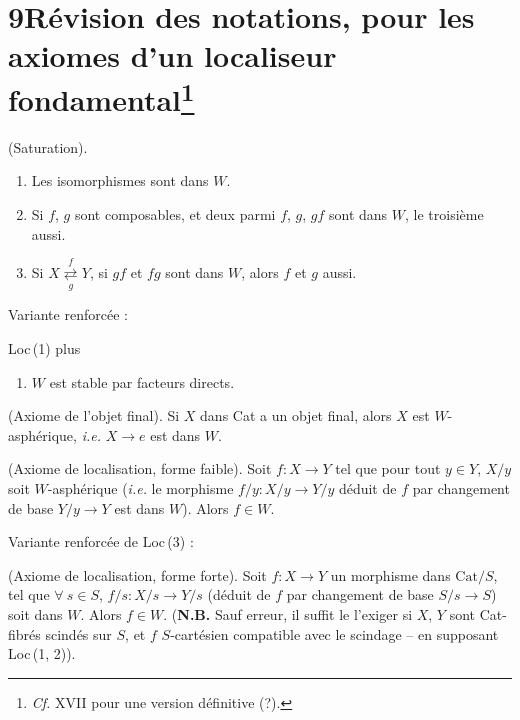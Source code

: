 \documentclass[11pt]{article}
\newcommand{\msp}[1]{\marginpar{\footnotesize [#1]}}
\begin{document}
\msp{page 116}

\section*{9\quad Révision des notations, pour les axiomes d'un localiseur fondamental\footnote[43]{\textit{Cf.} XVII pour une version définitive (?).}}

\begin{description}[style=sameline,leftmargin=6.5em]
\item[Loc\,(1)] (Saturation).
\begin{enumerate}[leftmargin=2.5em]
\item[$a$)] Les isomorphismes sont dans $W$.
\item[$b$)] Si $f$, $g$ sont composables, et deux parmi $f$, $g$, $gf$ sont dans $W$, le troisième aussi.
\item[$c$)] Si $X \underset{g}{\overset{f}{\rightleftarrows}} Y$, si $gf$ et $fg$ sont dans $W$, alors $f$ et $g$ aussi.
\end{enumerate}
\end{description}
\noindent Variante renforcée :
\begin{description}[style=sameline,leftmargin=6.5em]
\item[Loc\,(1\,bis)] Loc\,(1) plus
\begin{enumerate}[leftmargin=2.5em]
\item[$d$)] $W$ est stable par facteurs directs.
\end{enumerate}
\item[Loc\,(2)] (Axiome de l'objet final). Si $X$ dans Cat a un objet final, alors $X$ est $W$-asphérique, \textit{i.e.} $X \longrightarrow e$ est dans $W$.
\item[Loc\,(3)] (Axiome de localisation, forme faible). Soit $f : X \longrightarrow Y$ tel que pour tout $y \in Y$, $X/y$ soit $W$-asphérique (\textit{i.e.} le morphisme $f/y : X/y \longrightarrow Y/y$ déduit de $f$ par changement de base $Y/y \longrightarrow Y$ est dans $W$). Alors $f \in W$.
\end{description}
\noindent Variante renforcée de Loc\,(3) :
\begin{description}[style=sameline,leftmargin=6.5em]
\item[Loc\,(3\,bis)] (Axiome de localisation, forme forte). Soit $f : X \longrightarrow Y$ un morphisme dans $\mathrm{Cat}/S$, tel que $\forall\ s \in S$, $f/s : X/s \longrightarrow Y/s$ (déduit de $f$ par changement de base $S/s \longrightarrow S$) soit dans $W$. Alors $f \in W$. (\textbf{N.B.} Sauf erreur, il suffit le l'exiger si $X$, $Y$ sont Cat-fibrés scindés sur $S$, et $f$ $S$-cartésien compatible avec le scindage – en supposant Loc\,(1, 2)). %
\end{description}
\end{document}

